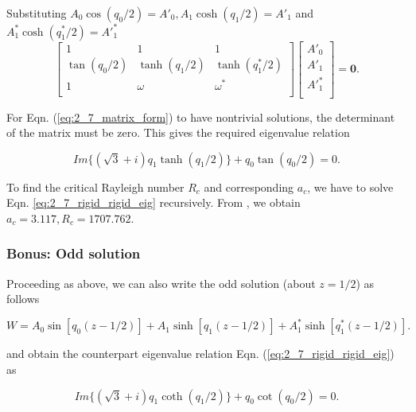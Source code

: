 \documentclass{article}
\begin{document}
Substituting $A_{0} \cos{(q_{0}/2)} = A'_{0}, A_{1}\cosh{(q_{1}/2)} = A'_{1}$ and $A^{*}_{1}\cosh{(q^{*}_{1}/2)} = A'^{*}_{1}$
%
\begin{equation}\label{eq:2_7_matrix_form}
\begin{bmatrix}
1   &   1   &   1 \\
\tan({q_{0}/2})   &   \tanh({q_{1}/2})   &   \tanh({q^{*}_{1}/2})\\
1   &   \omega &   \omega^{*}\\
\end{bmatrix}
\begin{bmatrix}
 A'_{0}\\
 A'_{1}\\
 A'^{*}_{1}\\
\end{bmatrix} 
= \boldsymbol{0}.
\end{equation}

For Eqn. (\ref{eq:2_7_matrix_form}) to have nontrivial solutions, the determinant of the matrix must be zero. This gives the required eigenvalue relation

\begin{equation}\label{eq:2_7_rigid_rigid_eig}
\boxed{
 Im \{(\sqrt{3} + i)q_{1} \tanh{(q_{1}/2)} \} + q_{0} \tan{(q_{0}/2)} = 0
 }.
\end{equation}

To find the critical Rayleigh number $R_{c}$ and corresponding $a_{c}$, we have to solve Eqn. \ref{eq:2_7_rigid_rigid_eig} recursively. From \cite{reid1958some}, we obtain $a_{c} = 3.117, R_{c} = 1707.762$. 
\subsubsection{Bonus: Odd solution}
Proceeding as above, we can also write the odd solution (about $z = 1/2$) as follows

\begin{equation}\label{eq:2_7_odd_soln}
\boxed{
 W = A_{0} \sin{[q_{0}(z-1/2)]} + A_{1} \sinh{[q_{1}(z-1/2)]} + A^{*}_{1} \sinh{[q^{*}_{1}(z-1/2)]}
 }.
\end{equation}

and obtain the counterpart eigenvalue relation Eqn. (\ref{eq:2_7_rigid_rigid_eig}) as


\begin{equation}\label{eq:2_7_rigid_rigid_eig_2}
\boxed{
 Im \{(\sqrt{3} + i)q_{1} \coth{(q_{1}/2)} \} + q_{0} \cot{(q_{0}/2)} = 0
 }.
\end{equation}


 \if@openright\cleardoublepage\else\clearpage\fi
 \cleardoublepage
 \pagestyle{empty}
\end{document}
